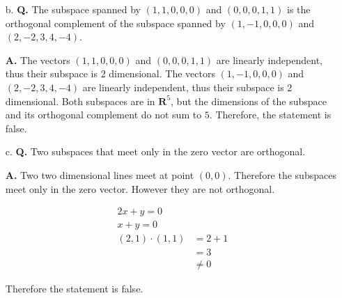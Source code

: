 \documentclass[main.tex]{subfiles}
\begin{document}
\begin{enumerate}
\begin{enumerate}
        \item [b.] \textbf{Q.} The subspace spanned by $(1,1,0,0,0)$ and $(0,0,0,1,1)$ is the orthogonal complement of the subspace spanned by $(1,-1,0,0,0)$ and $(2,-2,3,4,-4)$. 
        
        \textbf{A.} The vectors $(1,1,0,0,0)$ and $(0,0,0,1,1)$ are linearly independent, thus their subspace is 2 dimensional. The vectors $(1,-1,0,0,0)$ and $(2,-2,3,4,-4)$ are linearly independent, thus their subspace is 2 dimensional. Both subspaces are in $\mathbf{R}^{5}$, but the dimensions of the subspace and its orthogonal complement do not sum to $5$. Therefore, the statement is false.  
        
        \item [c.] \textbf{Q.} Two subspaces that meet only in the zero vector are orthogonal. 
        
        \textbf{A.} Two two dimensional lines meet at point $(0,0)$. Therefore the subspaces meet only in the zero vector. However they are not orthogonal.
        
        $$
        \begin{aligned}
        2x+y=0 \\
        x+y=0 \\
        (2,1) \cdot(1,1) & =2+1 \\
        &=3 \\
        & \neq 0
        \end{aligned}
        $$
        
        Therefore the statement is false.
        
    \end{enumerate}
\end{enumerate}
\end{document}

